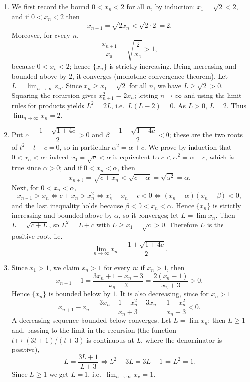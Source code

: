 \documentclass[11pt,a4paper]{article}
\newenvironment{solution}[1]{%
  \par\addvspace{1.7ex}%
  \noindent{\color{solutioncolor}\textbf{#1}}\hspace{0.55em}\ignorespaces}%
  {\par\addvspace{0.9ex}}
\begin{document}
\begin{solution}{Solution 2.3.1}\label{xs:2.3.1}
\begin{enumerate}[(1)]
  \item We first record the bound $0<x_n<2$ for all $n$, by induction: $x_1=\sqrt2<2$, and if $0<x_n<2$ then
  \[
  x_{n+1}=\sqrt{2x_n}<\sqrt{2\cdot 2}=2 .
  \]
  Moreover, for every $n$,
  \[
  \frac{x_{n+1}}{x_n}=\sqrt{\frac{2}{x_n}}>1,
  \]
  because $0<x_n<2$; hence $\{x_n\}$ is strictly increasing. Being increasing and bounded above by $2$, it converges (monotone convergence theorem). Let $L=\lim_{n\to\infty}x_n$. Since $x_n\ge x_1=\sqrt2$ for all $n$, we have $L\ge\sqrt2>0$. Squaring the recursion gives $x_{n+1}^2=2x_n$; letting $n\to\infty$ and using the limit rules for products yields $L^2=2L$, i.e.\ $L(L-2)=0$. As $L>0$, $L=2$. Thus $\lim_{n\to\infty}x_n=2$.

  \item Put $\alpha=\dfrac{1+\sqrt{1+4c}}{2}>0$ and $\beta=\dfrac{1-\sqrt{1+4c}}{2}<0$; these are the two roots of $t^2-t-c=0$, so in particular $\alpha^2=\alpha+c$. We prove by induction that $0<x_n<\alpha$: indeed $x_1=\sqrt c<\alpha$ is equivalent to $c<\alpha^2=\alpha+c$, which is true since $\alpha>0$; and if $0<x_n<\alpha$, then
  \[
  x_{n+1}=\sqrt{c+x_n}<\sqrt{c+\alpha}=\sqrt{\alpha^2}=\alpha .
  \]
  Next, for $0<x_n<\alpha$,
  \[
  x_{n+1}>x_n\iff c+x_n>x_n^2\iff x_n^2-x_n-c<0\iff (x_n-\alpha)(x_n-\beta)<0,
  \]
  and the last inequality holds because $\beta<0<x_n<\alpha$. Hence $\{x_n\}$ is strictly increasing and bounded above by $\alpha$, so it converges; let $L=\lim x_n$. Then $L=\sqrt{c+L}$, so $L^2=L+c$ with $L\ge x_1=\sqrt c>0$. Therefore $L$ is the positive root, i.e.
  \[
  \lim_{n\to\infty}x_n=\frac{1+\sqrt{1+4c}}{2}.
  \]

  \item Since $x_1>1$, we claim $x_n>1$ for every $n$: if $x_n>1$, then
  \[
  x_{n+1}-1=\frac{3x_n+1-x_n-3}{x_n+3}=\frac{2(x_n-1)}{x_n+3}>0 .
  \]
  Hence $\{x_n\}$ is bounded below by $1$. It is also decreasing, since for $x_n>1$
  \[
  x_{n+1}-x_n=\frac{3x_n+1-x_n^2-3x_n}{x_n+3}=\frac{1-x_n^2}{x_n+3}<0 .
  \]
  A decreasing sequence bounded below converges. Let $L=\lim x_n$; then $L\ge 1$ and, passing to the limit in the recursion (the function $t\mapsto(3t+1)/(t+3)$ is continuous at $L$, where the denominator is positive),
  \[
  L=\frac{3L+1}{L+3}\iff L^2+3L=3L+1\iff L^2=1 .
  \]
  Since $L\ge1$ we get $L=1$, i.e.\ $\lim_{n\to\infty}x_n=1$.
\end{enumerate}
\end{solution}
\end{document}
